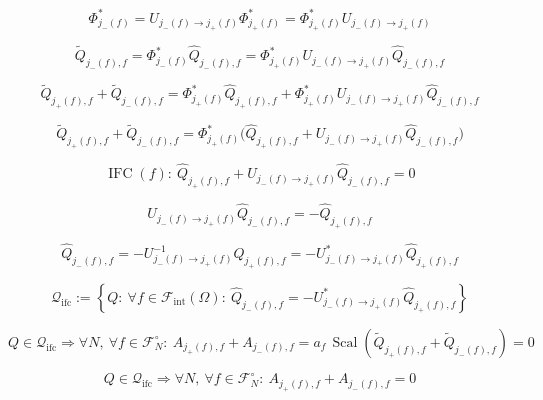 \documentclass[12pt]{article}
\begin{document}
\begin{equation}
\Phi_{j_-(f)}^{*}
=U_{j_-(f)\to j_+(f)}\Phi_{j_+(f)}^{*}
=\Phi_{j_+(f)}^{*}U_{j_-(f)\to j_+(f)}
\end{equation}

\begin{equation}
\widetilde{Q}_{j_-(f),f}
=\Phi_{j_-(f)}^{*}\widehat{Q}_{j_-(f),f}
=\Phi_{j_+(f)}^{*}U_{j_-(f)\to j_+(f)}\widehat{Q}_{j_-(f),f}
\end{equation}

\begin{equation}
\widetilde{Q}_{j_+(f),f}+\widetilde{Q}_{j_-(f),f}
=\Phi_{j_+(f)}^{*}\widehat{Q}_{j_+(f),f}
+\Phi_{j_+(f)}^{*}U_{j_-(f)\to j_+(f)}\widehat{Q}_{j_-(f),f}
\end{equation}

\begin{equation}
\widetilde{Q}_{j_+(f),f}+\widetilde{Q}_{j_-(f),f}
=\Phi_{j_+(f)}^{*}\Big(\widehat{Q}_{j_+(f),f}
+U_{j_-(f)\to j_+(f)}\widehat{Q}_{j_-(f),f}\Big)
\end{equation}

\begin{equation}
\operatorname{IFC}(f):\ \widehat{Q}_{j_+(f),f}
+U_{j_-(f)\to j_+(f)}\widehat{Q}_{j_-(f),f}=0
\end{equation}

\begin{equation}
U_{j_-(f)\to j_+(f)}\widehat{Q}_{j_-(f),f}=-\widehat{Q}_{j_+(f),f}
\end{equation}

\begin{equation}
\widehat{Q}_{j_-(f),f}
=-U_{j_-(f)\to j_+(f)}^{-1}\widehat{Q}_{j_+(f),f}
=-U_{j_-(f)\to j_+(f)}^{*}\widehat{Q}_{j_+(f),f}
\end{equation}

\begin{equation}
\mathcal{Q}_{\mathrm{ifc}}
:=\left\{
Q:\ \forall f\in \mathcal{F}_{\mathrm{int}}(\Omega):\ 
\widehat{Q}_{j_-(f),f}=-U_{j_-(f)\to j_+(f)}^{*}\widehat{Q}_{j_+(f),f}
\right\}
\end{equation}

\begin{equation}
Q\in\mathcal{Q}_{\mathrm{ifc}}\Longrightarrow
\forall N,\ \forall f\in\mathcal{F}_N^\circ:\ 
A_{j_+(f),f}+A_{j_-(f),f}
=a_f\,\operatorname{Scal}\!\left(\widetilde{Q}_{j_+(f),f}+\widetilde{Q}_{j_-(f),f}\right)=0
\end{equation}

\begin{equation}
Q\in\mathcal{Q}_{\mathrm{ifc}}\Longrightarrow
\forall N,\ \forall f\in\mathcal{F}_N^\circ:\ A_{j_+(f),f}+A_{j_-(f),f}=0
\end{equation}
\end{document}
